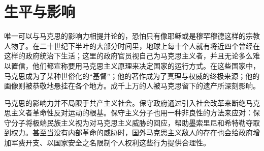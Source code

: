 \chapter{生平与影响}
唯一可以与马克思的影响力相提并论的，恐怕只有像耶稣或是穆罕穆德这样的宗教人物了。在二十世纪下半叶的大部分时间里，地球上每十个人就有将近四个曾经在这样的政府统治下生活；这里的政府官员视自己为马克思主义者，并且无论多么难以置信，他们都宣称要用马克思主义原理来决定国家的运行方式。在这些国家中，马克思成为了某种世俗化的“基督”；他的著作成为了真理与权威的终极来源；他的画像则被恭敬地悬挂在各个地方。成千上万的人被马克思留下的遗产所深刻影响。

马克思的影响力并不局限于共产主义社会。保守政府通过引入社会改革来断绝马克思主义者革命性反对运动的根基。保守主义分子也用一种非良性的方法来应对：保守分子将极端民族主义视为对马克思主义威胁的回应，帮助墨索里尼和希特勒夺取到权力。甚至当没有内部革命的威胁时，国外马克思主义敌人的存在也会给政府增加军费开支、以国家安全之名限制个人权利这些行为提供合理性。